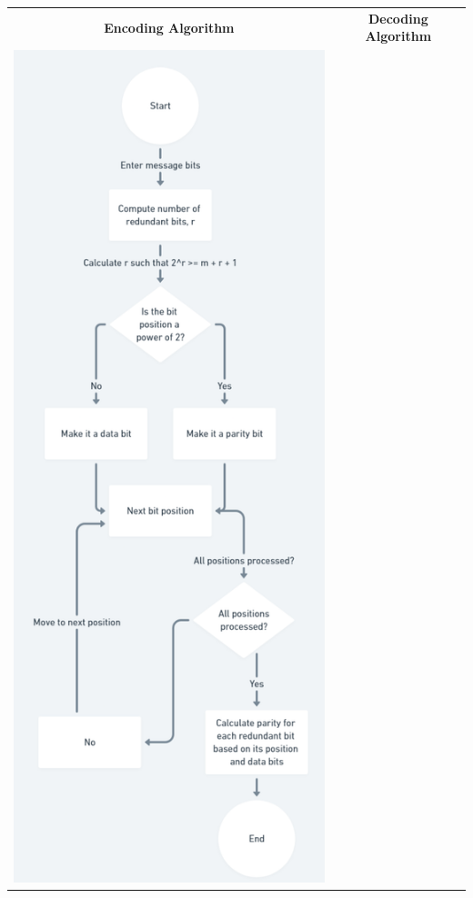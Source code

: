 \documentclass{article}
\numberwithin{equation}{section}
\numberwithin{figure}{section}
\numberwithin{table}{section}
\begin{document}
\begin{tabular}{cc}

\textbf{Encoding Algorithm} & \textbf{Decoding Algorithm} \\
       \includegraphics[scale=0.545]{encoding.png} 

\end{tabular}
\end{document}
